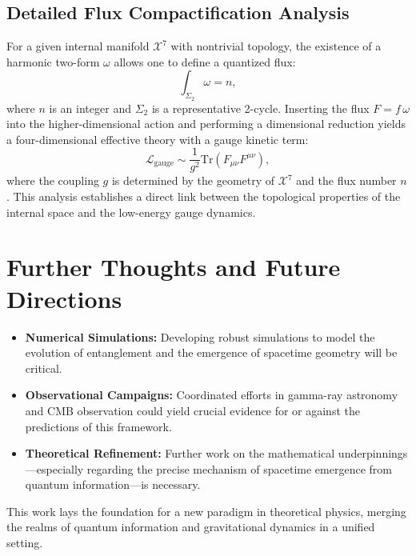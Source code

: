 \documentclass[12pt, a4paper]{article}
\begin{document}
\subsection{Detailed Flux Compactification Analysis}
For a given internal manifold \(\mathcal{X}^7\) with nontrivial topology, the existence of a harmonic two-form \(\omega\) allows one to define a quantized flux:
\begin{equation}
    \int_{\Sigma_2} \omega = n,
\end{equation}
where \(n\) is an integer and \(\Sigma_2\) is a representative 2-cycle. Inserting the flux \(F = f\, \omega\) into the higher-dimensional action and performing a dimensional reduction yields a four-dimensional effective theory with a gauge kinetic term:
\begin{equation}
    \mathcal{L}_{\text{gauge}} \sim \frac{1}{g^2} \text{Tr}(F_{\mu\nu}F^{\mu\nu}),
\end{equation}
where the coupling \(g\) is determined by the geometry of \(\mathcal{X}^7\) and the flux number \(n\). This analysis establishes a direct link between the topological properties of the internal space and the low-energy gauge dynamics.

\section{Further Thoughts and Future Directions}
\begin{itemize}
    \item \textbf{Numerical Simulations:} Developing robust simulations to model the evolution of entanglement and the emergence of spacetime geometry will be critical.
    \item \textbf{Observational Campaigns:} Coordinated efforts in gamma-ray astronomy and CMB observation could yield crucial evidence for or against the predictions of this framework.
    \item \textbf{Theoretical Refinement:} Further work on the mathematical underpinnings—especially regarding the precise mechanism of spacetime emergence from quantum information—is necessary.
\end{itemize}
This work lays the foundation for a new paradigm in theoretical physics, merging the realms of quantum information and gravitational dynamics in a unified setting.
\end{document}
